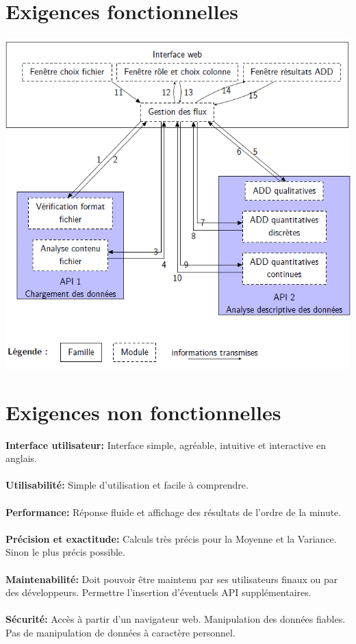 	\section{Exigences fonctionnelles}
	\begin{frame}
		\begin{center}\includegraphics[scale=0.43]{org.png}\end{center}
	\end{frame}
	
	\section{Exigences non fonctionnelles}
	\begin{frame}
		\textbf{Interface utilisateur:} Interface simple, agréable, intuitive et interactive en anglais.\\~\\ 
		\pause
		\textbf{Utilisabilité:} Simple d'utilisation et facile à comprendre.\\~\\
		\pause
		\textbf{Performance:} Réponse fluide et affichage des résultats de l'ordre de la minute.\\~\\
		\pause
		\textbf{Précision et exactitude:} Calculs très précis pour la Moyenne et la Variance. Sinon le plus précis possible.\\~\\
		\pause
		\textbf{Maintenabilité:} Doit pouvoir être maintenu par ses utilisateurs finaux ou par des développeurs. Permettre l'insertion d'éventuels API supplémentaires.\\~\\
		\pause
		\textbf{Sécurité:} Accès à partir d'un navigateur web. Manipulation des données fiables. Pas de manipulation de données à caractère personnel.\\
	\end{frame}
	

